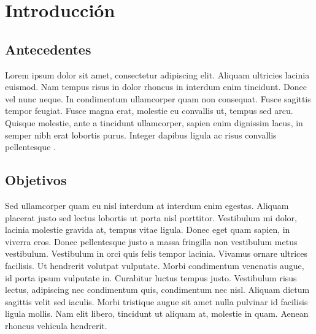 
\chapter{Introducción} %

\label{Chapter1} %



\section{Antecedentes}

Lorem ipsum dolor sit amet, consectetur adipiscing elit. Aliquam ultricies lacinia euismod. Nam tempus risus in dolor rhoncus in interdum enim tincidunt. Donec vel nunc neque. In condimentum ullamcorper quam non consequat. Fusce sagittis tempor feugiat. Fusce magna erat, molestie eu convallis ut, tempus sed arcu. Quisque molestie, ante a tincidunt ullamcorper, sapien enim dignissim lacus, in semper nibh erat lobortis purus. Integer dapibus ligula ac risus convallis pellentesque \cite{Anc2014}.



\section{Objetivos}

Sed ullamcorper quam eu nisl interdum at interdum enim egestas. Aliquam placerat justo sed lectus lobortis ut porta nisl porttitor. Vestibulum mi dolor, lacinia molestie gravida at, tempus vitae ligula. Donec eget quam sapien, in viverra eros. Donec pellentesque justo a massa fringilla non vestibulum metus vestibulum. Vestibulum in orci quis felis tempor lacinia. Vivamus ornare ultrices facilisis. Ut hendrerit volutpat vulputate. Morbi condimentum venenatis augue, id porta ipsum vulputate in. Curabitur luctus tempus justo. Vestibulum risus lectus, adipiscing nec condimentum quis, condimentum nec nisl. Aliquam dictum sagittis velit sed iaculis. Morbi tristique augue sit amet nulla pulvinar id facilisis ligula mollis. Nam elit libero, tincidunt ut aliquam at, molestie in quam. Aenean rhoncus vehicula hendrerit.

